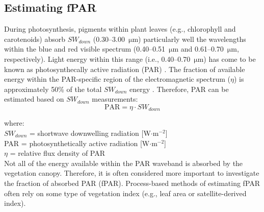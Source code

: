 \subsection{Estimating fPAR}
\label{sec:mst2efpar}
During photosynthesis, pigments within plant leaves (e.g., chlorophyll and carotenoids) absorb $SW_{down}$ (0.30--3.00~$\mathrm{\mu}$m) particularly well the wavelengths within the blue and red visible spectrum (0.40--0.51~$\mathrm{\mu}$m and 0.61--0.70~$\mathrm{\mu}$m, respectively).  
Light energy within this range (i.e., 0.40--0.70~$\mathrm{\mu}$m) has come to be known as photosynthecally active radiation (PAR) \parencite{oke87}.  
The fraction of available energy within the PAR-specific region of the electromagnetic spectrum ($\eta$) is approximately 50\% of the total $SW_{down}$ energy \parencite{stanhill77}.  
Therefore, PAR can be estimated based on $SW_{down}$ measurements:
%
%
\begin{equation}
\label{eq:sw2par}
    \text{PAR} = \eta \cdot SW_{down}
\end{equation}

\noindent where:\\
\indent $SW_{down}$ = shortwave downwelling radiation [W$\cdot$m$^{-2}$]\\
\indent PAR = photosynthetically active radiation [W$\cdot$m$^{-2}$]\\
\indent $\eta$ = relative flux density of PAR\\

\noindent Not all of the energy available within the PAR waveband is absorbed by the vegetation canopy.  
Therefore, it is often considered more important to investigate the fraction of absorbed PAR (fPAR).  
Process-based methods of estimating fPAR often rely on some type of vegetation index (e.g., leaf area or satellite-derived index).  

